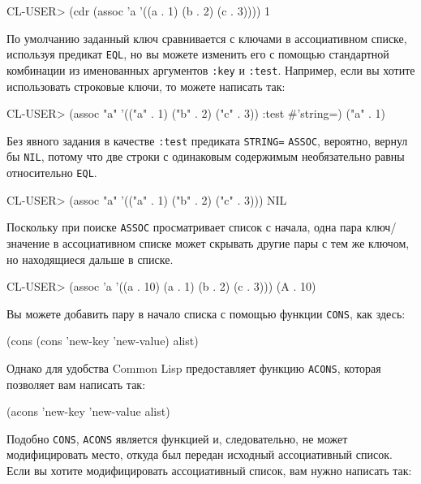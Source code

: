 \begin{myverb}
CL-USER> (cdr (assoc 'a '((a . 1) (b . 2) (c . 3))))
1
\end{myverb}

По умолчанию заданный ключ сравнивается с ключами в ассоциативном списке, используя
предикат \lstinline{EQL}, но вы можете изменить его с помощью стандартной комбинации из
именованных аргументов \lstinline{:key} и \lstinline{:test}. Например, если вы хотите использовать
строковые ключи, то можете написать так:
  
\begin{myverb}
CL-USER> (assoc "a" '(("a" . 1) ("b" . 2) ("c" . 3)) :test #'string=)
("a" . 1)
\end{myverb}

Без явного задания в качестве \lstinline{:test} предиката \lstinline{STRING=} \lstinline{ASSOC}, вероятно,
вернул бы \lstinline{NIL}, потому что две строки с одинаковым содержимым необязательно равны
относительно \lstinline{EQL}.

\begin{myverb}
CL-USER> (assoc "a" '(("a" . 1) ("b" . 2) ("c" . 3)))
NIL
\end{myverb}

Поскольку при поиске \lstinline{ASSOC} просматривает список с начала, одна пара ключ/значение в
ассоциативном списке может скрывать другие пары с тем же ключом, но находящиеся дальше в
списке.

\begin{myverb}
CL-USER> (assoc 'a '((a . 10) (a . 1) (b . 2) (c . 3)))
(A . 10)
\end{myverb}

Вы можете добавить пару в начало списка с помощью функции \lstinline{CONS}, как здесь:

\begin{myverb}
(cons (cons 'new-key 'new-value) alist)
\end{myverb}

Однако для удобства Common Lisp предоставляет функцию \lstinline{ACONS}, которая позволяет вам
написать так:

\begin{myverb}
(acons 'new-key 'new-value alist)
\end{myverb}

Подобно \lstinline{CONS}, \lstinline{ACONS} является функцией и, следовательно, не может
модифицировать место, откуда был передан исходный ассоциативный список. Если вы хотите
модифицировать ассоциативный список, вам нужно написать так:

